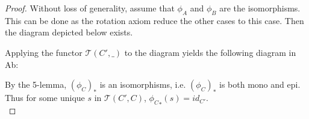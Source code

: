     \begin{proof}
        Without loss of generality, assume that $\phi_A$ and $\phi_B$ are the isomorphisms. This can be done as the rotation axiom reduce the other cases to this case. Then the diagram depicted below exists.
        \begin{center}
        \end{center}
        Applying the functor $\mathcal{T}(C',\_)$ to the diagram yields the following diagram in Ab:
        \begin{center}
        \end{center}
        By the 5-lemma, $(\phi_C)_*$ is an isomorphisms, i.e. $(\phi_C)_*$ is both mono and epi. Thus for some unique $s$ in $\mathcal{T}(C',C)$, ${\phi_C}_*(s)=id_{C'}$. \\ 


\end{proof}
